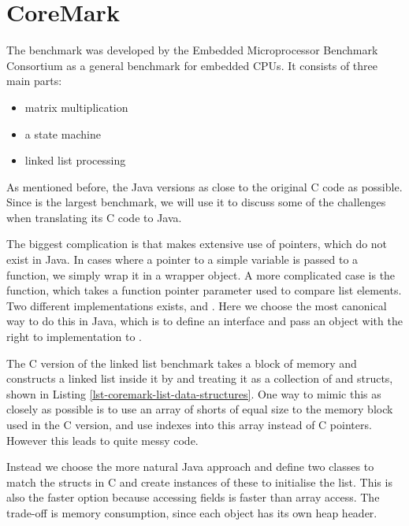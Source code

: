 \section{CoreMark}
\label{sec-evaluation-coremark}

The  benchmark was developed by the Embedded Microprocessor Benchmark Consortium as a general benchmark for embedded CPUs. It consists of three main parts:
\begin{itemize}
  \item matrix multiplication
  \item a state machine
  \item linked list processing
\end{itemize}

As mentioned before, the Java versions as close to the original C code as possible. Since  is the largest benchmark, we will use it to discuss some of the challenges when translating its C code to Java.

The biggest complication is that  makes extensive use of pointers, which do not exist in Java. In cases where a pointer to a simple variable is passed to a function, we simply wrap it in a wrapper object. A more complicated case is the  function, which takes a function pointer parameter  used to compare list elements. Two different implementations exists,  and . Here we choose the most canonical way to do this in Java, which is to define an interface and pass an object with the right to implementation to .

The C version of the linked list benchmark takes a block of memory and constructs a linked list inside it by and treating it as a collection of  and  structs, shown in Listing \ref{lst-coremark-list-data-structures}. One way to mimic this as closely as possible is to use an array of shorts of equal size to the memory block used in the C version, and use indexes into this array instead of C pointers. However this leads to quite messy code.

Instead we choose the more natural Java approach and define two classes to match the structs in C and create instances of these to initialise the list. This is also the faster option because accessing fields is faster than array access. The trade-off is memory consumption, since each object has its own heap header.

